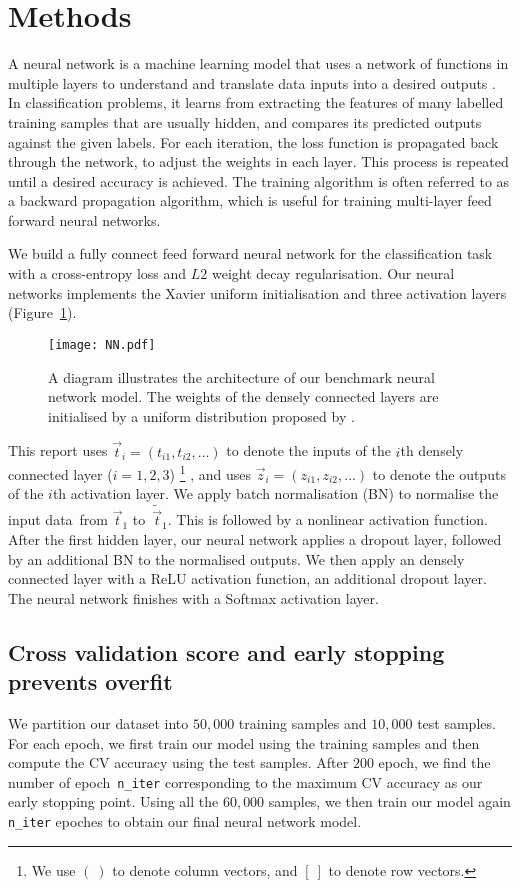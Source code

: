 \section{Methods \label{chapter2}}
A neural network is a machine learning model that uses a network of functions in multiple layers to understand and translate data inputs into a desired outputs \citep{Bishop:2006:PRM:1162264}.
In classification problems, it learns from extracting the features of many labelled training samples that are usually hidden, and compares its predicted outputs against the given labels.
For each iteration, the loss function is propagated back through the network,
to adjust the weights in each layer.
This process is repeated until a desired accuracy is achieved.
The training algorithm is often referred to as a backward propagation algorithm,
which is useful for training multi-layer feed forward neural networks.

We build a fully connect feed forward neural network for the classification task with a cross-entropy loss and $L2$ weight decay regularisation. Our neural networks implements the Xavier uniform initialisation and three activation layers (Figure~\ref{fig:nn}). 
\begin{figure}
    \centering
    \texttt{[image: NN.pdf]}
    \caption{A diagram illustrates the architecture of our benchmark neural network model. The weights of the densely connected layers are initialised by a uniform distribution proposed by \citet{pmlr-v9-glorot10a}.}
    \label{fig:nn}
\end{figure}
This report uses $\vec t_i=(t_{i1},t_{i2},\ldots)$ to denote the inputs of the $i$th densely connected layer ($i=1,2,3$)
\footnote{We use $(\ )$ to denote column vectors, and $[\ ]$ to denote row vectors.}
, and uses $\vec z_i=(z_{i1},z_{i2},\ldots)$ to denote the outputs of the $i$th activation layer. 
We apply batch normalisation (BN) to normalise the input data~from $\vec t_1$ to~$\tilde{\vec t}_1$. This is followed by a nonlinear activation function. After the first hidden layer, our neural network applies a dropout layer, followed by an additional BN to the normalised outputs. 
We then apply an densely connected layer with a ReLU activation function, an additional dropout layer. The neural network finishes with a Softmax activation layer. 

\subsection{Cross validation score and early stopping prevents overfit\label{sec:early}}
We partition our dataset into $50,000$ training samples and $10,000$ test samples. For each epoch, we first train our model using the training samples and then compute the CV accuracy using the test samples. After $200$ epoch, we find the number of epoch~\texttt{n\_iter} corresponding to the maximum CV accuracy as our early stopping point. Using all the $60,000$ samples, we then train our model again  \texttt{n\_iter} epoches to obtain our final neural network model.


